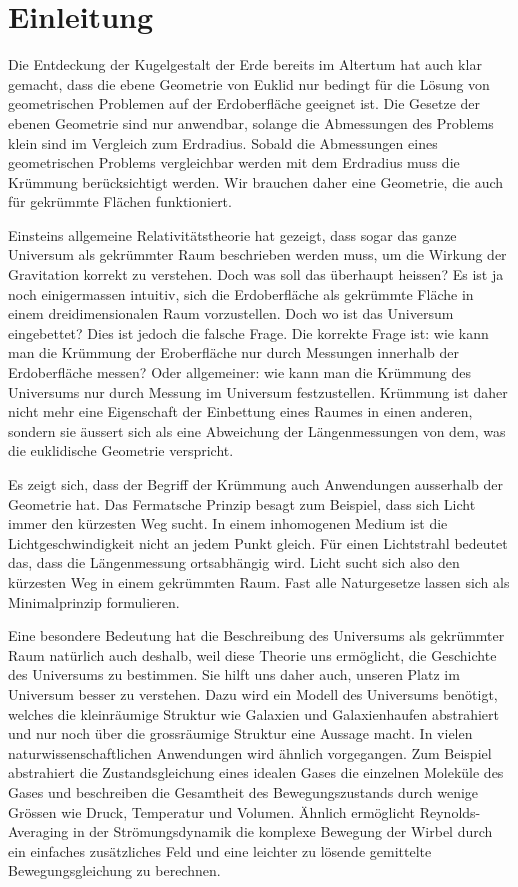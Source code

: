 %
%
%
\chapter*{Einleitung\label{chapter:einleitung}}
\rhead{}
Die Entdeckung der Kugelgestalt der Erde bereits im Altertum hat auch
klar gemacht, dass die ebene Geometrie von Euklid nur bedingt für
die Lösung von geometrischen Problemen auf der Erdoberfläche geeignet
ist.
Die Gesetze der ebenen Geometrie sind nur anwendbar, solange 
die Abmessungen des Problems klein sind im Vergleich zum Erdradius.
Sobald die Abmessungen eines geometrischen Problems vergleichbar werden
mit dem Erdradius muss die Krümmung berücksichtigt werden.
Wir brauchen daher eine Geometrie, die auch für gekrümmte Flächen
funktioniert.

Einsteins allgemeine Relativitätstheorie hat gezeigt, dass sogar das
ganze Universum als gekrümmter Raum beschrieben werden muss, um die 
Wirkung der Gravitation korrekt zu verstehen.
Doch was soll das überhaupt heissen?
Es ist ja noch einigermassen intuitiv, sich die Erdoberfläche
als gekrümmte Fläche in einem dreidimensionalen Raum vorzustellen.
Doch wo ist das Universum eingebettet?
Dies ist jedoch die falsche Frage.
Die korrekte Frage ist: wie kann man die Krümmung der Eroberfläche
nur durch Messungen innerhalb der Erdoberfläche messen?
Oder allgemeiner: wie kann man die Krümmung des Universums nur durch
Messung im Universum festzustellen.
Krümmung ist daher nicht mehr eine Eigenschaft der Einbettung eines
Raumes in einen anderen, sondern sie äussert sich als eine Abweichung
der Längenmessungen von dem, was die euklidische Geometrie verspricht.

Es zeigt sich, dass der Begriff der Krümmung auch Anwendungen ausserhalb
der Geometrie hat.
Das Fermatsche Prinzip besagt zum Beispiel, dass sich Licht immer
den kürzesten Weg sucht.
In einem inhomogenen Medium ist die Lichtgeschwindigkeit nicht
an jedem Punkt gleich.
Für einen Lichtstrahl bedeutet das, dass die Längenmessung ortsabhängig wird.
Licht sucht sich also den kürzesten Weg in einem gekrümmten Raum.
Fast alle Naturgesetze lassen sich als Minimalprinzip formulieren.

Eine besondere Bedeutung hat die Beschreibung des Universums als gekrümmter
Raum natürlich auch deshalb, weil diese Theorie uns ermöglicht,
die Geschichte des Universums zu bestimmen.
Sie hilft uns daher auch, unseren Platz im Universum besser zu
verstehen.
Dazu wird ein Modell des Universums benötigt, welches die kleinräumige
Struktur wie Galaxien und Galaxienhaufen abstrahiert und nur noch
über die grossräumige Struktur eine Aussage macht.
In vielen naturwissenschaftlichen Anwendungen wird ähnlich vorgegangen.
Zum Beispiel abstrahiert die Zustandsgleichung eines idealen Gases
die einzelnen Moleküle des Gases und beschreiben die Gesamtheit des
Bewegungszustands durch wenige Grössen wie Druck, Temperatur und Volumen.
Ähnlich ermöglicht Reynolds-Averaging in der Strömungsdynamik die 
komplexe Bewegung der Wirbel durch ein einfaches zusätzliches Feld und
eine leichter zu lösende gemittelte Bewegungsgleichung zu berechnen.

